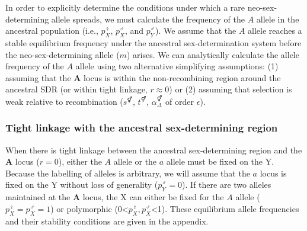 \documentclass[12pt]{article}
\begin{document}
In order to explicitly determine the conditions under which a rare neo-sex-determining allele spreads, we must calculate the frequency of the $A$ allele in the ancestral population (i.e., $p^\female_X$, $p^\male_X$, and $p^\male_Y$). 
We assume that the $A$ allele reaches a stable equilibrium frequency under the ancestral sex-determination system before the neo-sex-determining allele ($m$) arises. 
We can analytically calculate the allele frequency of the $A$ allele using two alternative simplifying assumptions: 
(1) assuming that the \textbf{A} locus is within the non-recombining region around the ancestral SDR (or within tight linkage, $r \approx 0$) or (2) assuming that selection is weak relative to recombination ($s^\Hermaphrodite$, $t^\Hermaphrodite$, $\alpha_{\Delta}^\Hermaphrodite$ of order $\epsilon$). 

\subsubsection*{Tight linkage with the ancestral sex-determining region}

When there is tight linkage between the ancestral sex-determining region and the \textbf{A} locus ($r=0$), either the $A$ allele or the $a$ allele must be fixed on the Y. 
Because the labelling of alleles is arbitrary, we will assume that the $a$ locus is fixed on the Y without loss of generality ($p^\male_Y=0$). 
If there are two alleles maintained at the \textbf{A} locus, the X can either be fixed for the $A$ allele ($p^\female_X=p^\male_X=1$) or polymorphic (0<$p^\female_X, p^\male_X$<1). These equilibrium allele frequencies and their stability conditions are given in the appendix.
\end{document}
